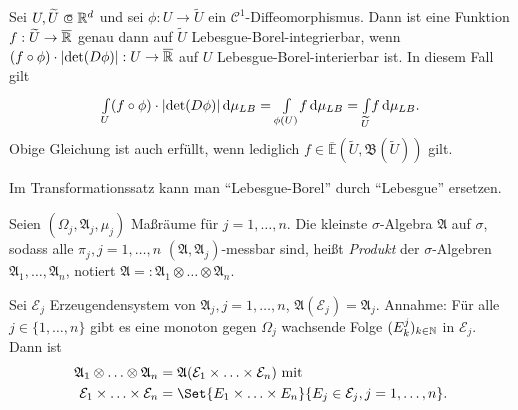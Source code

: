 \documentclass{cheat-sheet}
\newcommand{\Alg}{\mathfrak{A}} %
\newcommand{\Bor}{\mathfrak{B}} %
\newcommand{\E}{\mathbb{E}} %
\newcommand{\Cont}{\mathcal{C}} %
\theoremstyle{definition}
\begin{document}

\begin{satz}
  Sei $U, \widetilde{U} \opn \R^d$ und sei $\phi : U \to \widetilde{U}$ ein $\Cont^1$-Diffeomorphismus. Dann ist eine Funktion $f : \widetilde{U} \to \overline{\mathbb{R}}$ genau dann auf $\widetilde{U}$ Lebesgue-Borel-integrierbar, wenn $(f \circ \phi) \cdot \lvert\det(D\phi)\rvert : U \to \overline{\mathbb{R}}$ auf $U$ Lebesgue-Borel-interierbar ist. In diesem Fall gilt
  \[ {\textstyle \int\limits_{U}^{}} (f \circ \phi) \cdot \lvert\det(D\phi)\rvert \,\mathrm{d} \mu_{LB} = {\textstyle \int\limits_{\phi(U)}^{}} f \,\mathrm{d} \mu_{LB} = {\textstyle \int\limits_{\widetilde{U}}^{}} f \,\mathrm{d} \mu_{LB}. \]
  Obige Gleichung ist auch erfüllt, wenn lediglich $f \in \overline{\E}(\widetilde{U}, \Bor(\widetilde{U}))$ gilt.
\end{satz}

\begin{bem}
  Im Transformationssatz kann man "`Lebesgue-Borel"' durch "`Lebesgue"' ersetzen.
\end{bem}


% 

\begin{defn}
  Seien $(\Omega_j, \Alg_j, \mu_j)$ Maßräume für $j = 1, \ldots, n$. Die kleinste $\sigma$-Algebra $\Alg$ auf $\sigma$, sodass alle $\pi_j, j = 1, \ldots, n$ $(\Alg, \Alg_j)$-messbar sind, heißt \emph{Produkt} der $\sigma$-Algebren $\Alg_1, \ldots, \Alg_n$, notiert $\Alg =: \Alg_1 \otimes \ldots \otimes \Alg_n$.
\end{defn}

\begin{satz}
  Sei $\mathcal{E}_j$ Erzeugendensystem von $\Alg_j, j = 1, \ldots, n$, \dh{} $\Alg(\mathcal{E}_j) = \Alg_j$. Annahme: Für alle $j \in \{ 1, \ldots, n \}$ gibt es eine monoton gegen $\Omega_j$ wachsende Folge $(E^j_k)_{k \in \mathbb{N}}$ in $\mathcal{E}_j$. Dann ist
  \begin{align*}
    \Alg_1 \otimes \ldots \otimes \Alg_n &= \Alg(\mathcal{E}_1 \times \ldots \times \mathcal{E}_n) \text{ mit }\\
    \mathcal{E}_1 \times \ldots \times \mathcal{E}_n &= \Set{ E_1 \times \ldots \times E_n }{ E_j \in \mathcal{E}_j, j = 1, \ldots, n }.
  \end{align*}
\end{satz}
\end{document}
